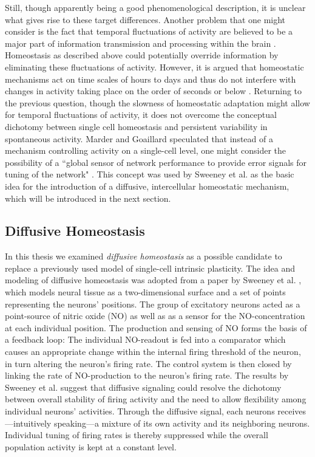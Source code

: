 \documentclass[10pt,a4paper]{article}
\begin{document}
Still, though apparently being a good phenomenological description, it is unclear what gives rise to these target differences. Another problem that one might consider is the fact that temporal fluctuations of activity are believed to be a major part of information transmission and processing within the brain \cite[p. 123--150]{Theor_Neur_Dayan}. Homeostasis as described above could potentially override information by eliminating these fluctuations of activity. However, it is argued that homeostatic mechanisms act on time scales of hours to days and thus do not interfere with changes in activity taking place on the order of seconds or below \cite{Turrigiano_2011}. Returning to the previous question, though the slowness of homeostatic adaptation might allow for temporal fluctuations of activity, it does not overcome the conceptual dichotomy between single cell homeostasis and persistent variability in spontaneous activity. Marder and Goaillard speculated that instead of a mechanism controlling activity on a single-cell level, one might consider the possibility of a ``global sensor of network performance to provide error signals for tuning of the network" \cite{Marder_2006}. This concept was used by Sweeney et al. as the basic idea for the introduction of a diffusive, intercellular homeostatic mechanism, which will be introduced in the next section.

\subsection{Diffusive Homeostasis}\label{DIff_Hom_Intro_Section}
In this thesis we examined \textit{diffusive homeostasis} as a possible candidate to replace a previously used model of single-cell intrinsic plasticity. The idea and modeling of diffusive homeostasis was adopted from a paper by Sweeney et al. \cite{Sweeney_Paper}, which models neural tissue as a two-dimensional surface and a set of points representing the neurons' positions. The group of excitatory neurons acted as a point-source of nitric oxide (NO) as well as as a sensor for the NO-concentration at each individual position. The production and sensing of NO forms the basis of a feedback loop: The individual NO-readout is fed into a comparator which causes an appropriate change within the internal firing threshold of the neuron, in turn altering the neuron's firing rate. The control system is then closed by linking the rate of NO-production to the neuron's firing rate. The results by Sweeney et al. suggest that diffusive signaling could resolve the dichotomy between overall stability of firing activity and the need to allow flexibility among individual neurons' activities. Through the diffusive signal, each neurons receives---intuitively speaking---a mixture of its own activity and its neighboring neurons. Individual tuning of firing rates is thereby suppressed while the overall population activity is kept at a constant level.
\end{document}
